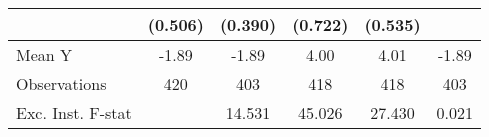 {\begin{tabular}{l*{5}{c}}
            &     (0.506)         &     (0.390)         &     (0.722)         &     (0.535)         &                     \\
\midrule
Mean Y      &       -1.89         &       -1.89         &        4.00         &        4.01         &       -1.89         \\
Observations&         420         &         403         &         418         &         418         &         403         \\
Exc. Inst. F-stat&                     &      14.531         &      45.026         &      27.430         &       0.021         \\
\bottomrule
\end{tabular}
}
